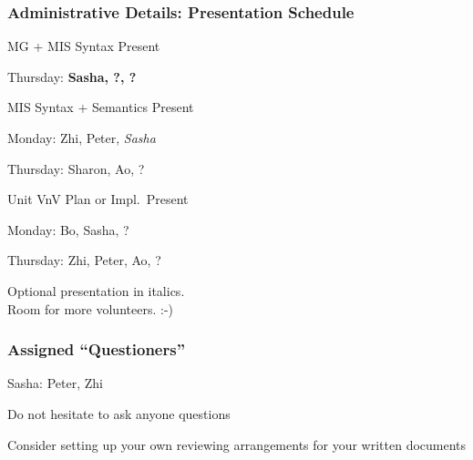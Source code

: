 \documentclass[t,12pt,numbers,fleqn]{beamer}
\begin{document}
\begin{frame}
\frametitle{Administrative Details: Presentation Schedule}

\bi
\item MG + MIS Syntax Present
\bi
\item Thursday: \textbf{Sasha, ?, ?}
\ei
\item MIS Syntax + Semantics Present
\bi
\item Monday: Zhi, Peter, \emph{Sasha}
\item Thursday:  Sharon, Ao, ?
\ei
\item Unit VnV Plan or Impl.\ Present
\bi
\item Monday: Bo, Sasha, ?
\item Thursday: Zhi, Peter, Ao, ?
\ei
\ei

Optional presentation in italics.\\
Room for more volunteers.  :-)

\end{frame}


\begin{frame}
\frametitle{Assigned ``Questioners''}

\be
\item Sasha: Peter, Zhi
\ee
\bi
\item Do not hesitate to ask anyone questions
\item Consider setting up your own reviewing arrangements for your written
  documents
\ei
\end{frame}

\end{document}
